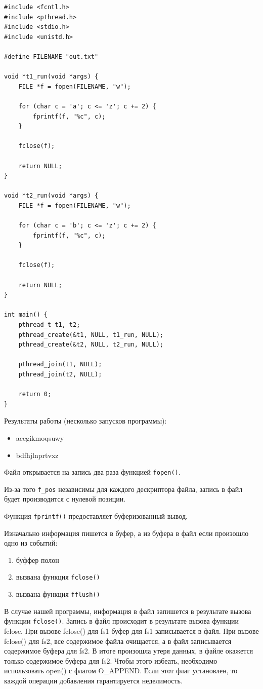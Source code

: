 \begin{lstlisting}[caption={\text{Программа №3 (многопоточная)}}]
#include <fcntl.h>
#include <pthread.h>
#include <stdio.h>
#include <unistd.h>

#define FILENAME "out.txt"

void *t1_run(void *args) {
	FILE *f = fopen(FILENAME, "w");
	
	for (char c = 'a'; c <= 'z'; c += 2) {
		fprintf(f, "%c", c);
	}
	
	fclose(f);
	
	return NULL;
}

void *t2_run(void *args) {
	FILE *f = fopen(FILENAME, "w");
	
	for (char c = 'b'; c <= 'z'; c += 2) {
		fprintf(f, "%c", c);
	}
	
	fclose(f);
	
	return NULL;
}

int main() {
	pthread_t t1, t2;
	pthread_create(&t1, NULL, t1_run, NULL);
	pthread_create(&t2, NULL, t2_run, NULL);
	
	pthread_join(t1, NULL);
	pthread_join(t2, NULL);
	
	return 0;
}
\end{lstlisting}

Результаты работы (несколько запусков программы): 
\begin{itemize}
	\item acegikmoqsuwy
	\item bdfhjlnprtvxz
\end{itemize}

 Файл открывается на запись два раза функцией \texttt{fopen()}.
 
  Из-за того \texttt{f\_pos} независимы для каждого дескриптора файла, запись в файл будет производится с нулевой позиции.

Функция \texttt{fprintf()} предоставляет буферизованный вывод.

 Изначально информация пишется в буфер, а из буфера в файл если произошло одно из
событий:
\begin{enumerate}
	\item буффер полон
	\item вызвана функция \texttt{fclose()}
	\item вызвана функция \texttt{fflush()}
\end{enumerate}

В случае нашей программы, информация в файл запишется в результате вызова функции \texttt{fclose()}. Запись в файл происходит в результате вызова функции fclose. При вызове fclose() для fs1 буфер для fs1 записывается в файл. При вызове fclose() для fs2, все содержимое файла очищается, а в файл записывается содержимое буфера для fs2. В итоге произошла утеря данных, в файле окажется только содержимое буфера для fs2. Чтобы этого избеать, необходимо использовать open() с флагом O\_APPEND. Если этот флаг установлен, то каждой операции добавления гарантируется неделимость. 
 



